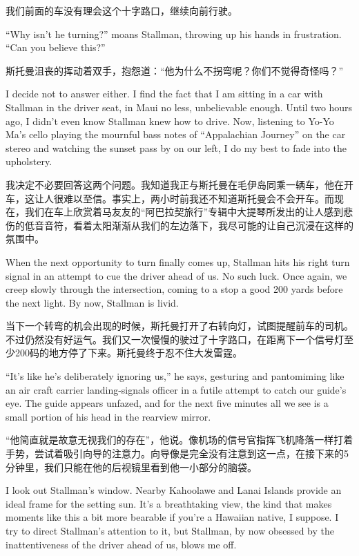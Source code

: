 \ifdefined\chs
我们前面的车没有理会这个十字路口，继续向前行驶。
\fi

\ifdefined\eng
``Why isn't he turning?'' moans Stallman, throwing up his hands in frustration. ``Can you believe this?''
\fi

\ifdefined\chs
斯托曼沮丧的挥动着双手，抱怨道：“他为什么不拐弯呢？你们不觉得奇怪吗？”
\fi

\ifdefined\eng
I decide not to answer either. I find the fact that I am sitting in a car with Stallman in the driver seat, in Maui no less, unbelievable enough. Until two hours ago, I didn't even know Stallman knew how to drive. Now, listening to Yo-Yo Ma's cello playing the mournful bass notes of ``Appalachian Journey'' on the car stereo and watching the sunset pass by on our left, I do my best to fade into the upholstery.
\fi

\ifdefined\chs
我决定不必要回答这两个问题。我知道我正与斯托曼在毛伊岛同乘一辆车，他在开车，这让人很难以至信。事实上，两小时前我还不知道斯托曼会不会开车。而现在，我们在车上欣赏着马友友的“阿巴拉契旅行”专辑中大提琴所发出的让人感到悲伤的低音音符，看着太阳渐渐从我们的左边落下，我尽可能的让自己沉浸在这样的氛围中。
\fi

\ifdefined\eng
When the next opportunity to turn finally comes up, Stallman hits his right turn signal in an attempt to cue the driver ahead of us. No such luck. Once again, we creep slowly through the intersection, coming to a stop a good 200 yards before the next light. By now, Stallman is livid.
\fi

\ifdefined\chs
当下一个转弯的机会出现的时候，斯托曼打开了右转向灯，试图提醒前车的司机。不过仍然没有好运气。我们又一次慢慢的驶过了十字路口，在距离下一个信号灯至少200码的地方停了下来。斯托曼终于忍不住大发雷霆。
\fi

\ifdefined\eng
``It's like he's deliberately ignoring us,'' he says, gesturing and pantomiming like an air craft carrier landing-signals officer in a futile attempt to catch our guide's eye. The guide appears unfazed, and for the next five minutes all we see is a small portion of his head in the rearview mirror.
\fi

\ifdefined\chs
“他简直就是故意无视我们的存在”，他说。像机场的信号官指挥飞机降落一样打着手势，尝试着吸引向导的注意力。向导像是完全没有注意到这一点，在接下来的5分钟里，我们只能在他的后视镜里看到他一小部分的脑袋。
\fi

\ifdefined\eng
I look out Stallman's window. Nearby Kahoolawe and Lanai Islands provide an ideal frame for the setting sun. It's a breathtaking view, the kind that makes moments like this a bit more bearable if you're a Hawaiian native, I suppose. I try to direct Stallman's attention to it, but Stallman, by now obsessed by the inattentiveness of the driver ahead of us, blows me off.
\fi

